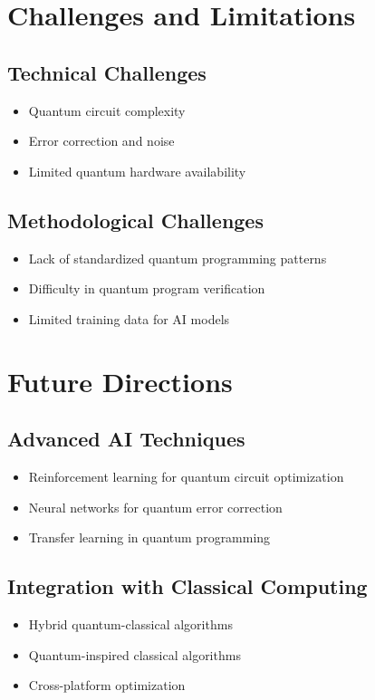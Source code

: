 \documentclass[12pt,a4paper]{article}
\begin{document}
\section{Challenges and Limitations}
\subsection{Technical Challenges}
\begin{itemize}[leftmargin=*]
    \item Quantum circuit complexity
    \item Error correction and noise
    \item Limited quantum hardware availability
\end{itemize}

\subsection{Methodological Challenges}
\begin{itemize}[leftmargin=*]
    \item Lack of standardized quantum programming patterns
    \item Difficulty in quantum program verification
    \item Limited training data for AI models
\end{itemize}

\section{Future Directions}
\subsection{Advanced AI Techniques}
\begin{itemize}[leftmargin=*]
    \item Reinforcement learning for quantum circuit optimization
    \item Neural networks for quantum error correction
    \item Transfer learning in quantum programming
\end{itemize}

\subsection{Integration with Classical Computing}
\begin{itemize}[leftmargin=*]
    \item Hybrid quantum-classical algorithms
    \item Quantum-inspired classical algorithms
    \item Cross-platform optimization
\end{itemize}
\end{document}
